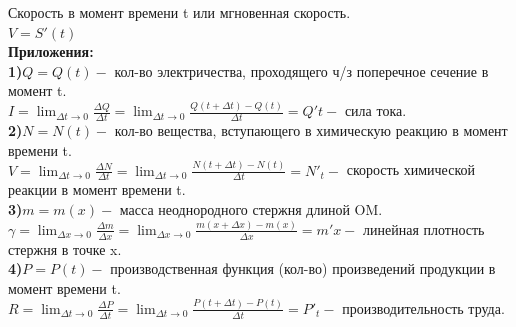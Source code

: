 \documentclass[12pt, a4paper]{article}
\theoremstyle{remark}
\begin{document}
	Скорость в момент времени t или мгновенная скорость. \\
	
	$V = S'(t)$ \\
	
	\textbf{Приложения:} \\
	
	\textbf{1)}$Q = Q(t) -$ кол-во электричества, проходящего ч/з поперечное сечение в момент t.\\
	
	\noindent$I = \lim_{\Delta t \to 0} \frac{\Delta Q}{\Delta t} = \lim_{\Delta t \to 0} \frac{Q(t + \Delta t) - Q(t)}{\Delta t} = Q't -$ сила тока. \\
	
	\textbf{2)}$ N = N(t) -$ кол-во вещества, вступающего в химическую реакцию в момент времени t.\\
	
	\noindent$V = \lim_{\Delta t \to 0} \frac{\Delta N}{\Delta t} = \lim_{\Delta t \to 0} \frac{N(t + \Delta t) - N(t)}{\Delta t} = N'_t -$ скорость химической реакции в момент времени t. \\
	
	\textbf{3)}$m = m(x) -$ масса неоднородного стержня длиной OM. \\
	
	\noindent$\gamma = \lim_{\Delta x \to 0} \frac{\Delta m}{\Delta x} = \lim_{\Delta x \to 0} \frac{m(x + \Delta x) - m(x)}{\Delta x} = m'x -$ линейная плотность стержня в точке x. \\
	
	\textbf{4)}$P = P(t) -$ производственная функция (кол-во) произведений продукции в момент времени t. \\
	
	\noindent$R = \lim_{\Delta t \to 0} \frac{\Delta P}{\Delta t} = \lim_{\Delta t \to 0} \frac{P(t + \Delta t) - P(t)}{\Delta t} = P'_t -$ производительность труда. 
\end{document}
